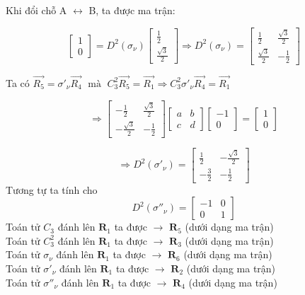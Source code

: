 \documentclass{article}
\begin{document}
Khi đổi chỗ A $\leftrightarrow$ B, ta được ma trận:

\[
    \renewcommand{\arraystretch}{0.75}
    \begin{bmatrix}
        1 \\
        0
    \end{bmatrix}
    = D^2(\sigma_\nu)
    \begin{bmatrix}
        \frac{1}{2} \\
        \frac{\sqrt{3}}{2}
    \end{bmatrix}
    \Rightarrow  D^2(\sigma_\nu) =
    \begin{bmatrix}
        \frac{1}{2}        & \frac{\sqrt{3}}{2} \\
        \frac{\sqrt{3}}{2} & -\frac{1}{2}
    \end{bmatrix}
\]

Ta có $ \vec{R_5} = \sigma'_\nu \vec{R_4} \; \text{ mà }\; C_3^2 \vec{R_5} =
    \vec{R_1} \Rightarrow C_3^2 \sigma'_\nu \vec{R_4} = \vec{R_1}$

\[
    \renewcommand{\arraystretch}{0.75}
    \Rightarrow
    \begin{bmatrix}
        -\frac{1}{2}        & \frac{\sqrt{3}}{2} \\
        -\frac{\sqrt{3}}{2} & -\frac{1}{2}
    \end{bmatrix}
    \begin{bmatrix}
        a & b \\
        c & d
    \end{bmatrix}
    \begin{bmatrix}
        -1 \\
        0
    \end{bmatrix}
    =
    \begin{bmatrix}
        1 \\
        0
    \end{bmatrix}
\]

\[
    \renewcommand{\arraystretch}{0.75}
    \Rightarrow D^2\left(\sigma'_\nu\right) =
    \begin{bmatrix}
        \frac{1}{2}  & -\frac{\sqrt{3}}{2} \\
        -\frac{3}{2} & -\frac{1}{2}
    \end{bmatrix}
\]
Tương tự ta tính cho
\[
    \renewcommand{\arraystretch}{0.75}
    D^2\left(\sigma''_\nu\right) =
    \begin{bmatrix}
        -1 & 0 \\
        0  & 1
    \end{bmatrix}
\]
\noindent Toán tử $C_3$ đánh lên $\textbf{R}_1$ ta được $\rightarrow$ $\textbf{R}_5$ (dưới dạng ma trận)\\
Toán tử $C_3^2$ đánh lên $\textbf{R}_1$ ta được $\rightarrow$ $\textbf{R}_3$ (dưới dạng ma trận)\\
Toán tử $\sigma_\nu$ đánh lên $\textbf{R}_1$ ta được $\rightarrow$ $\textbf{R}_6$ (dưới dạng ma trận)\\
Toán tử $\sigma'_\nu$ đánh lên $\textbf{R}_1$ ta được $\rightarrow$ $\textbf{R}_2$ (dưới dạng ma trận)\\
Toán tử $\sigma''_\nu$ đánh lên $\textbf{R}_1$ ta được $\rightarrow$ $\textbf{R}_4$ (dưới dạng ma trận)
\end{document}

